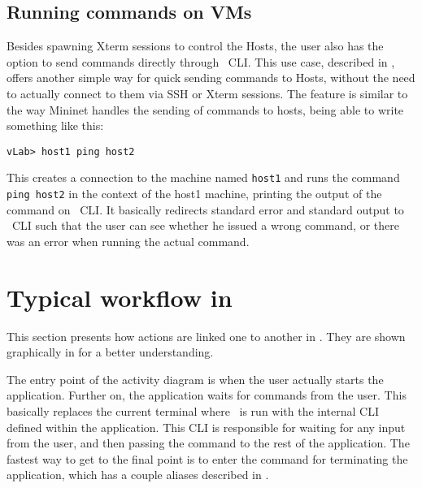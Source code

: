 \subsection{Running commands on VMs}
\label{sub-sec:run-cmd}


Besides spawning Xterm sessions to control the Hosts, the user also has the option to send commands directly through \project\ CLI.
This use case, described in , offers another simple way for quick sending commands to Hosts, without the need to actually connect to them via SSH or Xterm sessions.
The feature is similar to the way Mininet handles the sending of commands to hosts, being able to write something like this:

\lstset{label=lst:ping-example}
\begin{lstlisting}
vLab> host1 ping host2
\end{lstlisting}

This creates a connection to the machine named \texttt{host1} and runs the command \texttt{ping host2} in the context of the host1 machine, printing the output of the command on \project\ CLI.
It basically redirects standard error and standard output to \project\ CLI such that the user can see whether he issued a wrong command, or there was an error when running the actual command.

\section{Typical workflow in \project}
\label{sec:typical-workflow}

This section presents how actions are linked one to another in \project.
They are shown graphically in  for a better understanding.


The entry point of the activity diagram is when the user actually starts the application.
Further on, the application waits for commands from the user.
This basically replaces the current terminal where \project\ is run with the internal CLI defined within the application.
This CLI is responsible for waiting for any input from the user, and then passing the command to the rest of the application.
The fastest way to get to the final point is to enter the command for terminating the application, which has a couple aliases described in .

